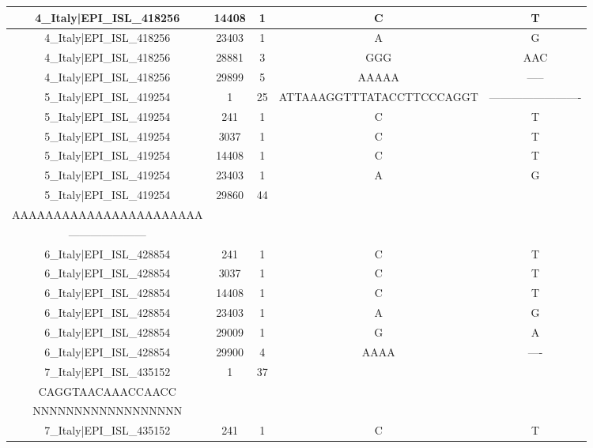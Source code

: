 \documentclass[a4paper,10pt]{article}
\begin{document}
\begin{longtable}{@{}ccccc@{}}
4\_Italy|EPI\_ISL\_418256 & 14408 & 1 & C & T \\* \midrule
4\_Italy|EPI\_ISL\_418256 & 23403 & 1 & A & G \\* \midrule
4\_Italy|EPI\_ISL\_418256 & 28881 & 3 & GGG & AAC \\* \midrule
4\_Italy|EPI\_ISL\_418256 & 29899 & 5 & AAAAA & ----- \\* \midrule
5\_Italy|EPI\_ISL\_419254 & 1 & 25 & ATTAAAGGTTTATACCTTCCCAGGT & ------------------------- \\* \midrule
5\_Italy|EPI\_ISL\_419254 & 241 & 1 & C & T \\* \midrule
5\_Italy|EPI\_ISL\_419254 & 3037 & 1 & C & T \\* \midrule
5\_Italy|EPI\_ISL\_419254 & 14408 & 1 & C & T \\* \midrule
5\_Italy|EPI\_ISL\_419254 & 23403 & 1 & A & G \\* \midrule
5\_Italy|EPI\_ISL\_419254 & 29860 & 44 & \begin{tabular}[c]{@{}c@{}}AGGAGAATGACAAAAAAAAAA\\ AAAAAAAAAAAAAAAAAAAAAAA\end{tabular} & \begin{tabular}[c]{@{}c@{}}-----------------------\\ ---------------------\end{tabular} \\* \midrule
6\_Italy|EPI\_ISL\_428854 & 241 & 1 & C & T \\* \midrule
6\_Italy|EPI\_ISL\_428854 & 3037 & 1 & C & T \\* \midrule
6\_Italy|EPI\_ISL\_428854 & 14408 & 1 & C & T \\* \midrule
6\_Italy|EPI\_ISL\_428854 & 23403 & 1 & A & G \\* \midrule
6\_Italy|EPI\_ISL\_428854 & 29009 & 1 & G & A \\* \midrule
6\_Italy|EPI\_ISL\_428854 & 29900 & 4 & AAAA & ---- \\* \midrule
7\_Italy|EPI\_ISL\_435152 & 1 & 37 & \begin{tabular}[c]{@{}c@{}}ATTAAAGGTTTATACCTTCC\\ CAGGTAACAAACCAACC\end{tabular} & \begin{tabular}[c]{@{}c@{}}NNNNNNNNNNNNNNNNNNN\\ NNNNNNNNNNNNNNNNNN\end{tabular} \\* \midrule
7\_Italy|EPI\_ISL\_435152 & 241 & 1 & C & T \\* \midrule

\end{longtable}
\end{document}
